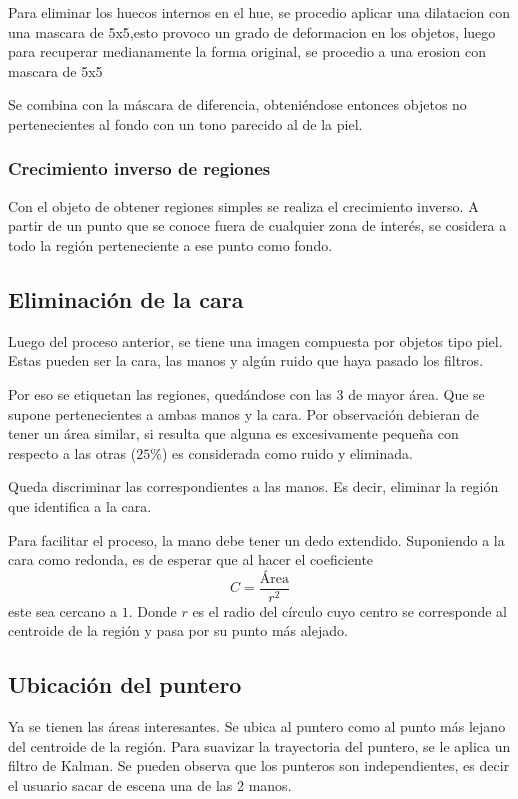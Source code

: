 \documentclass[conference,a4paper,10pt,oneside,final]{tfmpd}
\begin{document}
   		 Para eliminar los huecos internos en el hue, se procedio aplicar una dilatacion con una mascara de 5x5,esto provoco un grado de deformacion
   		 en los objetos, luego para recuperar medianamente la forma original, se procedio a una erosion con mascara de 5x5

   		 Se combina con la máscara de diferencia, obteniéndose entonces
   		 objetos no pertenecientes al fondo con un tono parecido al de la piel.

   		 \subsubsection{Crecimiento inverso de regiones}
   			 Con el objeto de obtener regiones simples se realiza el crecimiento inverso.
   			 A partir de un punto que se conoce fuera de cualquier zona de interés,
   			 se cosidera a todo la región perteneciente a ese punto como fondo.


    \subsection{Eliminación de la cara}
   		 Luego del proceso anterior, se tiene una imagen compuesta por objetos
   	 tipo piel. Estas pueden ser la cara, las manos y algún ruido que haya pasado los filtros.

   		 Por eso se etiquetan las regiones, quedándose con las $3$ de mayor área.
   	 Que se supone pertenecientes a ambas manos y la cara.
   	 Por observación debieran de tener un área similar, si resulta que alguna
   		 es excesivamente pequeña con respecto a las otras ($25\%$) es considerada
   	 como ruido y eliminada.

   	 
   		 Queda discriminar las correspondientes a las manos.
   	 Es decir, eliminar la región que identifica a la cara.

   	 Para facilitar el proceso, la mano debe tener un dedo extendido.
   	 Suponiendo a la cara como redonda, es de esperar que al hacer
   	 el coeficiente
   		 \[C = \frac{\mbox{Área}}{r^2}\]
   	 este sea cercano a $1$. Donde $r$ es el radio del círculo cuyo centro
   	 se corresponde al centroide de la región y pasa por su punto más alejado.

    \subsection{Ubicación del puntero}
   	 Ya se tienen las áreas interesantes.
   		 Se ubica al puntero como al punto más lejano del centroide de la región.
	 Para suavizar la trayectoria del puntero, se le aplica un filtro de Kalman.
	Se pueden observa que los punteros son independientes, es decir el usuario 
	sacar de escena  una de las 2 manos.
\end{document}
